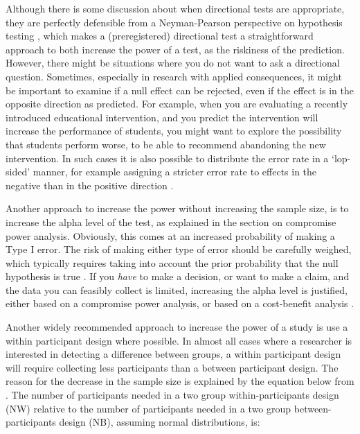 \documentclass[
  oneside]{book}
\begin{document}
Although there is some discussion about when directional tests are appropriate, they are perfectly defensible from a Neyman-Pearson perspective on hypothesis testing \citep{cho_is_2013}, which makes a (preregistered) directional test a straightforward approach to both increase the power of a test, as the riskiness of the prediction. However, there might be situations where you do not want to ask a directional question. Sometimes, especially in research with applied consequences, it might be important to examine if a null effect can be rejected, even if the effect is in the opposite direction as predicted. For example, when you are evaluating a recently introduced educational intervention, and you predict the intervention will increase the performance of students, you might want to explore the possibility that students perform worse, to be able to recommend abandoning the new intervention. In such cases it is also possible to distribute the error rate in a `lop-sided' manner, for example assigning a stricter error rate to effects in the negative than in the positive direction \citep{rice_heads_1994}.

Another approach to increase the power without increasing the sample size, is to increase the alpha level of the test, as explained in the section on compromise power analysis. Obviously, this comes at an increased probability of making a Type I error. The risk of making either type of error should be carefully weighed, which typically requires taking into account the prior probability that the null hypothesis is true \citep{cascio_open_1983, mudge_setting_2012, murphy_statistical_2014, miller_quest_2019}. If you \emph{have} to make a decision, or want to make a claim, and the data you can feasibly collect is limited, increasing the alpha level is justified, either based on a compromise power analysis, or based on a cost-benefit analysis \citep{field_minimizing_2004, baguley_understanding_2004}.

Another widely recommended approach to increase the power of a study is use a within participant design where possible. In almost all cases where a researcher is interested in detecting a difference between groups, a within participant design will require collecting less participants than a between participant design. The reason for the decrease in the sample size is explained by the equation below from \citet{maxwell_designing_2017}. The number of participants needed in a two group within-participants design (NW) relative to the number of participants needed in a two group between-participants design (NB), assuming normal distributions, is:
\end{document}
